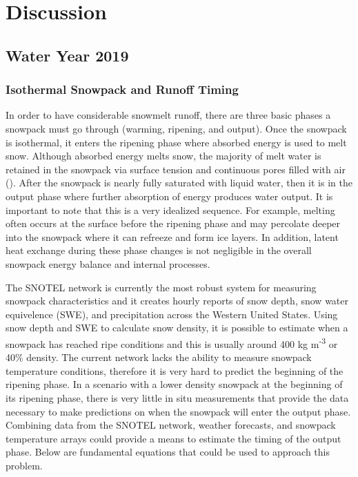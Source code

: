 \chapter{Discussion}
\section{Water Year 2019} 
\subsection{Isothermal Snowpack and Runoff Timing}
In order to have considerable snowmelt runoff, there are three basic phases a snowpack must go through (warming, ripening, and output). Once the snowpack is isothermal, it enters the ripening phase where absorbed energy is used to melt snow. Although absorbed energy melts snow, the majority of melt water is retained in the snowpack via surface tension and continuous pores filled with air (\cite{dingman2015}). After the snowpack is nearly fully saturated with liquid water, then it is in the output phase where further absorption of energy produces water output. It is important to note that this is a very idealized sequence. For example, melting often occurs at the surface before the ripening phase and may percolate deeper into the snowpack where it can refreeze and form ice layers. In addition, latent heat exchange during these phase changes is not negligible in the overall snowpack energy balance and internal processes. 

The SNOTEL network is currently the most robust system for measuring snowpack characteristics and it creates hourly reports of snow depth, snow water equivelence (SWE), and precipitation across the Western United States. Using snow depth and SWE to calculate snow density, it is possible to estimate when a snowpack has reached ripe conditions and this is usually around 400 kg m\textsuperscript{-3} or 40\% density. The current network lacks the ability to measure snowpack temperature conditions, therefore it is very hard to predict the beginning of the ripening phase. In a scenario with a lower density snowpack at the beginning of its ripening phase, there is very little in situ measurements that provide the data necessary to make predictions on when the snowpack will enter the output phase. Combining data from the SNOTEL network, weather forecasts, and snowpack temperature arrays could provide a means to estimate the timing of the output phase. Below are fundamental equations that could be used to approach this problem. 

